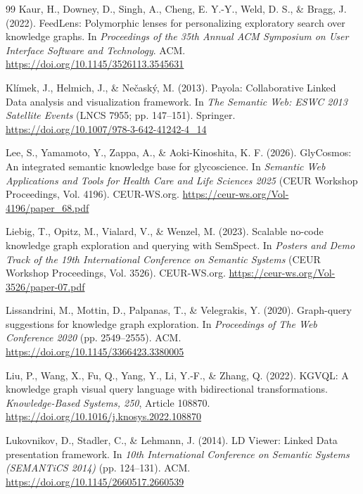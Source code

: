 \documentclass[manuscript,review,screen]{acmart}
\begin{document}
\begin{thebibliography}{99}
 Kaur, H., Downey, D., Singh, A., Cheng, E. Y.-Y., Weld, D. S., \& Bragg, J. (2022). FeedLens: Polymorphic lenses for personalizing exploratory search over knowledge graphs. In \textit{Proceedings of the 35th Annual ACM Symposium on User Interface Software and Technology}. ACM. \url{https://doi.org/10.1145/3526113.3545631}

 Kl\'{i}mek, J., Helmich, J., \& Ne\v{c}ask\'{y}, M. (2013). Payola: Collaborative Linked Data analysis and visualization framework. In \textit{The Semantic Web: ESWC 2013 Satellite Events} (LNCS 7955; pp. 147--151). Springer. \url{https://doi.org/10.1007/978-3-642-41242-4_14}

 Lee, S., Yamamoto, Y., Zappa, A., \& Aoki-Kinoshita, K. F. (2026). GlyCosmos: An integrated semantic knowledge base for glycoscience. In \textit{Semantic Web Applications and Tools for Health Care and Life Sciences 2025} (CEUR Workshop Proceedings, Vol. 4196). CEUR-WS.org. \url{https://ceur-ws.org/Vol-4196/paper_68.pdf}

 Liebig, T., Opitz, M., Vialard, V., \& Wenzel, M. (2023). Scalable no-code knowledge graph exploration and querying with SemSpect. In \textit{Posters and Demo Track of the 19th International Conference on Semantic Systems} (CEUR Workshop Proceedings, Vol. 3526). CEUR-WS.org. \url{https://ceur-ws.org/Vol-3526/paper-07.pdf}

 Lissandrini, M., Mottin, D., Palpanas, T., \& Velegrakis, Y. (2020). Graph-query suggestions for knowledge graph exploration. In \textit{Proceedings of The Web Conference 2020} (pp. 2549--2555). ACM. \url{https://doi.org/10.1145/3366423.3380005}

 Liu, P., Wang, X., Fu, Q., Yang, Y., Li, Y.-F., \& Zhang, Q. (2022). KGVQL: A knowledge graph visual query language with bidirectional transformations. \textit{Knowledge-Based Systems, 250}, Article 108870. \url{https://doi.org/10.1016/j.knosys.2022.108870}

 Lukovnikov, D., Stadler, C., \& Lehmann, J. (2014). LD Viewer: Linked Data presentation framework. In \textit{10th International Conference on Semantic Systems (SEMANTiCS 2014)} (pp. 124--131). ACM. \url{https://doi.org/10.1145/2660517.2660539}


\end{thebibliography}
\end{document}
